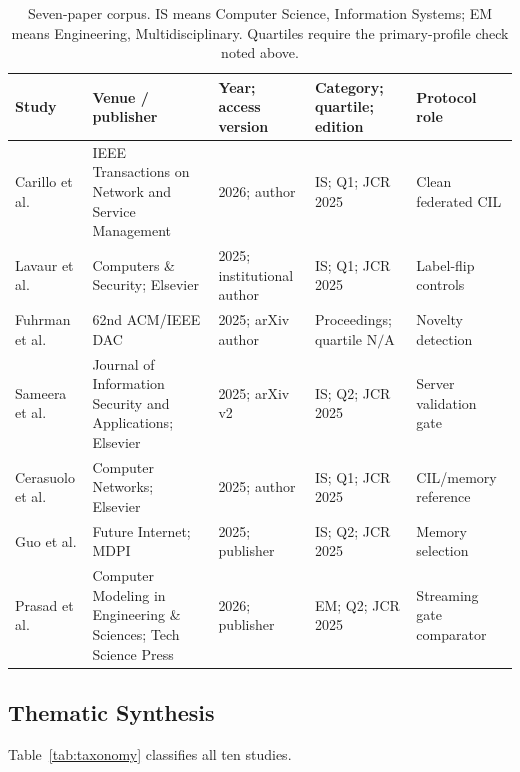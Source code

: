 \documentclass[10pt,a4paper]{article}
\newcommand{\NA}{\mathrm{N/A}}
\begin{document}
\begin{table}[htbp]
\centering\footnotesize
\caption{Seven-paper corpus. IS means Computer Science, Information Systems; EM means Engineering, Multidisciplinary. Quartiles require the primary-profile check noted above.}
\label{tab:corpus}
\begin{tabularx}{\linewidth}{L{2.5cm}Y L{2.1cm}L{1.9cm}L{2.0cm}}
\toprule
Study & Venue / publisher & Year; access version & Category; quartile; edition & Protocol role\\
\midrule
Carillo et al. \cite{carillo} & IEEE Transactions on Network and Service Management & 2026; author & IS; Q1; JCR 2025 & Clean federated CIL\\
Lavaur et al. \cite{lavaur} & Computers \& Security; Elsevier & 2025; institutional author & IS; Q1; JCR 2025 & Label-flip controls\\
Fuhrman et al. \cite{cnd} & 62nd ACM/IEEE DAC & 2025; arXiv author & Proceedings; quartile $\NA$ & Novelty detection\\
Sameera et al. \cite{wei} & Journal of Information Security and Applications; Elsevier & 2025; arXiv v2 & IS; Q2; JCR 2025 & Server validation gate\\
Cerasuolo et al. \cite{cerasuolo} & Computer Networks; Elsevier & 2025; author & IS; Q1; JCR 2025 & CIL/memory reference\\
Guo et al. \cite{guo} & Future Internet; MDPI & 2025; publisher & IS; Q2; JCR 2025 & Memory selection\\
Prasad et al. \cite{ensemble} & Computer Modeling in Engineering \& Sciences; Tech Science Press & 2026; publisher & EM; Q2; JCR 2025 & Streaming gate comparator\\
\bottomrule
\end{tabularx}
\end{table}

\subsection{Thematic Synthesis}
Table~\ref{tab:taxonomy} classifies all ten studies.
\end{document}
